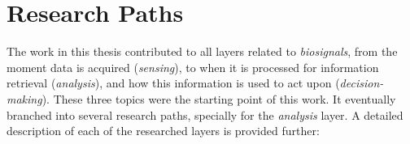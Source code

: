 
\section{Research Paths}

The work in this thesis contributed to all layers related to \textit{biosignals}, from the moment data is acquired (\textit{sensing}), to when it is processed for information retrieval (\textit{analysis}), and how this information is used to act upon (\textit{decision-making}). These three topics were the starting point of this work. It eventually branched into several research paths, specially for the \textit{analysis} layer.
A detailed description of each of the researched layers is provided further:


